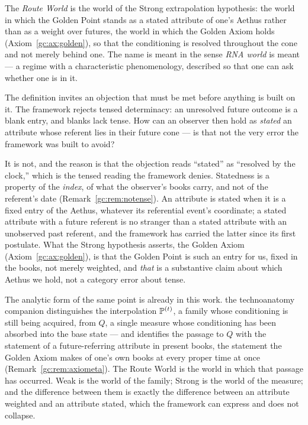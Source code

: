 \begin{definition}\label{gc:def:routeworld}
The \emph{Route World} is the world of the Strong extrapolation
hypothesis: the world in which the Golden Point stands as a stated
attribute of one's Aethus rather than as a weight over futures, the
world in which the Golden Axiom holds (Axiom~\ref{gc:ax:golden}), so that
the conditioning is resolved throughout the cone and not merely behind
one. The name is meant in the sense \emph{RNA world} is meant --- a
regime with a characteristic phenomenology, described so that one can
ask whether one is in it.
\end{definition}

\begin{remark}\label{gc:rem:statedcoherent}
The definition invites an objection that must be met before anything is
built on it. The framework rejects tensed determinacy: an unresolved
future outcome is a blank entry, and blanks lack tense. How can an
observer then hold as \emph{stated} an attribute whose referent lies in
their future cone --- is that not the very error the framework was built
to avoid?

It is not, and the reason is that the objection reads ``stated'' as
``resolved by the clock,'' which is the tensed reading the framework
denies. Statedness is a property of the \emph{index}, of what the
observer's books carry, and not of the referent's date
(Remark~\ref{gc:rem:notense}). An attribute is stated when it is a fixed entry
of the Aethus, whatever its referential event's coordinate; a stated
attribute with a future referent is no stranger than a stated attribute
with an unobserved past referent, and the framework has carried the
latter since its first postulate. What the Strong hypothesis asserts, the
Golden Axiom (Axiom~\ref{gc:ax:golden}), is
that the Golden Point is such an entry for us, fixed in the books,
not merely weighted, and \emph{that} is a substantive claim about
which Aethus we hold, not a category error about tense.

The analytic form of the same point is already in this work.
the technoanatomy companion \cite{GoldenTechnoanatomy} distinguishes the interpolation
$\mathbb{P}^{(t)}$, a family whose conditioning is still being acquired, from
$Q$, a single measure whose conditioning has been absorbed into the base
state --- and identifies the passage to $Q$ with the statement of a
future-referring attribute in present books, the statement the Golden
Axiom makes of one's own books at every proper time at once
(Remark~\ref{gc:rem:axiometa}). The Route World is the
world in which that passage has occurred. Weak is the world of the
family; Strong is the world of the measure; and the difference between
them is exactly the difference between an attribute weighted and an
attribute stated, which the framework can express and does not collapse.
\end{remark}

